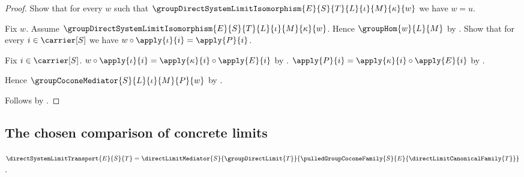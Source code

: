 \begin{proof}
    Show that for every $w$ such that
        $\groupDirectSystemLimitIsomorphism
            {E}{S}{T}{L}{\iota}{M}{\kappa}{w}$
        we have $w=u$.
    \begin{subproof}
        Fix $w$.
        Assume $\groupDirectSystemLimitIsomorphism
            {E}{S}{T}{L}{\iota}{M}{\kappa}{w}$.
        Hence $\groupHom{w}{L}{M}$ by
            .
        Show that for every $i\in\carrier[S]$ we have
            $w\circ\apply{\iota}{i}=\apply{P}{i}$.
        \begin{subproof}
            Fix $i\in\carrier[S]$.
            $w\circ\apply{\iota}{i}
                =\apply{\kappa}{i}\circ\apply{E}{i}$ by
                .
            $\apply{P}{i}=\apply{\kappa}{i}\circ\apply{E}{i}$ by
                .
        \end{subproof}
        Hence $\groupCoconeMediator{S}{L}{\iota}{M}{P}{w}$ by
            .
    \end{subproof}
    Follows by \auto.
\end{proof}

\subsection{The chosen comparison of concrete limits}

\begin{definition}\label{direct_system_limit_transport}
    $\directSystemLimitTransport{E}{S}{T}=
        \directLimitMediator
            {S}{\groupDirectLimit{T}}
            {\pulledGroupCoconeFamily
                {S}{E}{\directLimitCanonicalFamily{T}}}$.
\end{definition}

